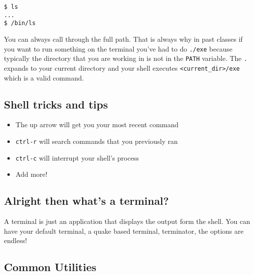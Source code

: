 \begin{verbatim}
$ ls
...
$ /bin/ls
\end{verbatim}

You can always call through the full path. That is always why in past classes if you want to run something on the terminal you've had to do \texttt{./exe} because typically the directory that you are working in is not in the \texttt{PATH} variable. The \texttt{.} expands to your current directory and your shell executes \texttt{\textless{}current\_dir\textgreater{}/exe} which is a valid command.

\subsection{Shell tricks and tips}

\begin{itemize}
\tightlist
\item
  The up arrow will get you your most recent command
\item
  \texttt{ctrl-r} will search commands that you previously ran
\item
  \texttt{ctrl-c} will interrupt your shell's process
\item
  Add more!
\end{itemize}

\subsection{Alright then what's a terminal?}

A terminal is just an application that displays the output form the shell. You can have your default terminal, a quake based terminal, terminator, the options are endless!

\subsection{Common Utilities}

